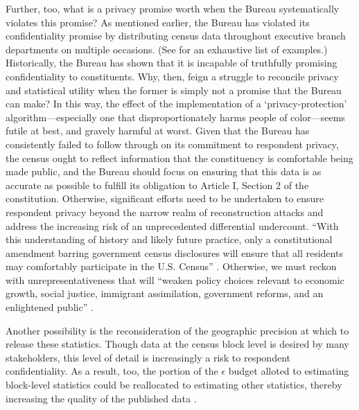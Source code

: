 Further, too, what is a privacy promise worth when the Bureau systematically violates this promise? As mentioned earlier, the Bureau has violated its confidentiality promise by distributing census data throughout executive branch departments on multiple occasions. (See \cite{fox_differential_2018} for an exhaustive list of examples.) Historically, the Bureau has shown that it is incapable of truthfully promising confidentiality to constituents. Why, then, feign a struggle to reconcile privacy and statistical utility when the former is simply not a promise that the Bureau can make? In this way, the effect of the implementation of a `privacy-protection' algorithm---especially one that disproportionately harms people of color---seems futile at best, and gravely harmful at worst. Given that the Bureau has consistently failed to follow through on its commitment to respondent privacy, the census ought to reflect information that the constituency is comfortable being made public, and the Bureau should focus on ensuring that this data is as accurate as possible to fulfill its obligation to Article I, Section 2 of the constitution. Otherwise, significant efforts need to be undertaken to ensure respondent privacy beyond the narrow realm of reconstruction attacks and address the increasing risk of an unprecedented differential undercount. ``With this understanding of history and likely future practice, only a constitutional amendment barring government census disclosures will ensure that all residents may comfortably participate in the U.S. Census'' \cite{fox_differential_2018}. Otherwise, we must reckon with unrepresentativeness that will ``weaken policy choices relevant to economic growth, social justice, immigrant assimilation, government reforms, and an enlightened public'' \cite{prewitt_census_2018}.

Another possibility is the reconsideration of the geographic precision at which to release these statistics. Though data at the census block level is desired by many stakeholders, this level of detail is increasingly a risk to respondent confidentiality. As a result, too, the portion of the $\epsilon$ budget alloted to estimating block-level statistics could be reallocated to estimating other statistics, thereby increasing the quality of the published data \cite{boyd_balancing_2020}.

